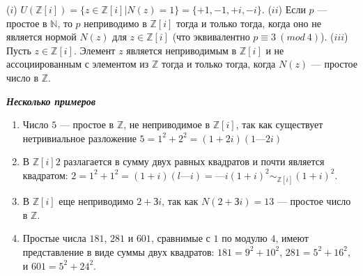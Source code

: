\begin{predl}
\textit{\indent} ($i$) $U(\mathds{Z}[i]) = \{z \in \mathds{Z}[i] | N(z) = 1\} = \{+1,-1,+i,-i\}$. \newline \indent ($ii$) Если $p$ — простое в $\mathds{N}$, то $p$ неприводимо в $\mathds{Z}[i]$ тогда и только тогда, когда оно не является нормой $N(z)$ для $z \in \mathds{Z}[i]$ (что эквивалентно $p \equiv 3\:(mod\:4)$). \newline \indent ($iii$) Пусть $z \in \mathds{Z}[i]$. Элемент $z$ является неприводимым в $\mathds{Z}[i]$ и не ассоциированным с элементом из $\mathds{Z}$ тогда и только тогда, когда $N(z)$ — простое число в $\mathds{Z}.$
\end{predl}

\noindent \textbf{ \large \textit{Несколько примеров}}
\begin{enumerate}
\item Число $5$ — простое в $\mathds{Z}$, не неприводимое в $\mathds{Z}[i]$, так как существует нетривиальное разложение $5 = 1^2 + 2^2 = (1 + 2i)(1 — 2i)$
\item В $\mathds{Z}[i] 2$ разлагается в сумму двух равных квадратов и почти является квадратом: $2 = 1^2  + 1^2  = (1 + i)(l — i) = —i(1 + i)^2 \sim_{\mathds{Z}[i]} (1 + i)^2.$
\item В $\mathds{Z}[i]$ еще неприводимо $2 + Зi$, так как $N(2 + Зi) = 13$ — простое число в $\mathds{Z}$.
\item Простые числа $181$, $281$ и $601$, сравнимые с $1$ по модулю $4$, имеют представление в виде суммы двух квадратов: $181 = 9^2 + 10^2$, $281 = 5^2 + 16^2$, и $601 = 5^2 + 24^2$.\\
\end{enumerate}


